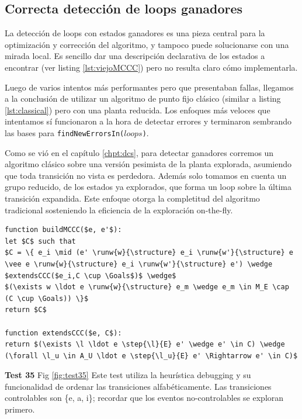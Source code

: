 \FloatBarrier
\subsection{Correcta detección de loops ganadores}

La detección de loops con estados ganadores es una pieza central para la optimización y corrección del algoritmo, y tampoco puede solucionarse con una mirada local. Es sencillo dar una descripción declarativa de los estados a encontrar (ver listing \ref{lst:viejoMCCC}) pero no resulta claro cómo implementarla. 

Luego de varios intentos más performantes pero que presentaban fallas, llegamos a la conclusión de utilizar un algoritmo de punto fijo clásico (similar a listing \ref{lst:classical}) pero con una planta reducida. Los enfoques más veloces que intentamos sí funcionaron a la hora de detectar errores y terminaron sembrando las bases para \texttt{findNewErrorsIn($loops$)}.

Como se vió en el capítulo \ref{chpt:dcs}, para detectar ganadores corremos un algoritmo clásico sobre una versión pesimista de la planta explorada, asumiendo que toda transición no vista es perdedora. Además solo tomamos en cuenta un grupo reducido, de los estados ya explorados, que forma un loop sobre la última transición expandida. Este enfoque otorga la completitud del algoritmo tradicional sosteniendo la eficiencia de la exploración on-the-fly.

\begin{lstlisting}[language={pseudocode},label={lst:viejoMCCC},caption={vieja descripción estados ganadores},float=ht, frame=single]
function buildMCCC($e, e'$):
let $C$ such that
$C = \{ e_i \mid (e' \runw{w}{\structure} e_i \runw{w'}{\structure} e \vee e \runw{w}{\structure} e_i \runw{w'}{\structure} e') \wedge $extendsCCC($e_i,C \cup \Goals$)$ \wedge$
$(\exists w \ldot e \runw{w}{\structure} e_m \wedge e_m \in M_E \cap (C \cup \Goals)) \}$
return $C$

function extendsCCC($e, C$):
return $(\exists \l \ldot e \step{\l}{E} e' \wedge e' \in C) \wedge (\forall \l_u \in A_U \ldot e \step{\l_u}{E} e' \Rightarrow e' \in C)$

\end{lstlisting}

\FloatBarrier
\textbf{Test 35} Fig \ref{fig:test35} 
Este test utiliza la heurística debugging y su funcionalidad de ordenar las transiciones alfabéticamente. Las transiciones controlables son \{e, a, i\}; recordar que los eventos no-controlables se exploran primero.

